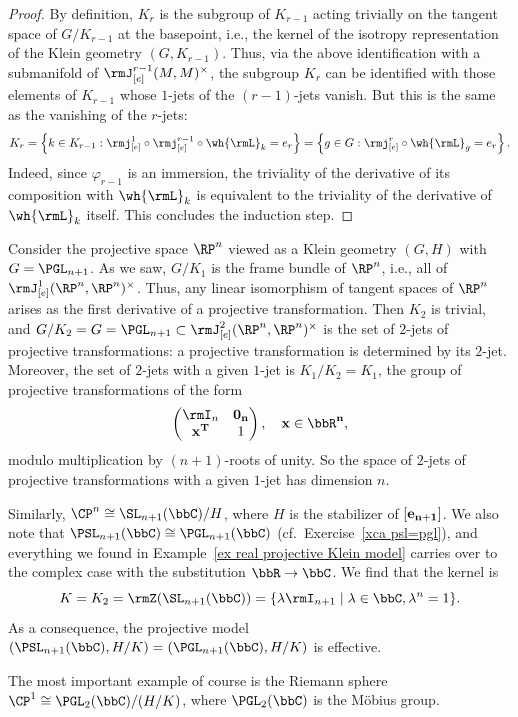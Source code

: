 \begin{proof}
    By definition, $K_r$ is the subgroup of $K_{r-1}$ acting trivially on the tangent space of $G\slash K_{r-1}$ at the basepoint, i.e., the kernel of the isotropy representation of the Klein geometry $(G,K_{r-1})$. Thus, via the above identification with a submanifold of $\rmJ^{r-1}_{[e]}(M,M)^\times$, the subgroup $K_r$ can be identified with those elements of $K_{r-1}$ whose $1$-jets of the $(r-1)$-jets vanish. But this is the same as the vanishing of the $r$-jets: 
    \[K_r=\left\{k\in K_{r-1}: \rmj^1_{[e]}\circ \rmj^{r-1}_{[e]}\circ\wh{\rmL}_k=e_r\right\}=\left\{g\in G: \rmj^r_{[e]}\circ \wh{\rmL}_g=e_r\right\}.\]
    Indeed, since $\varphi_{r-1}$ is an immersion, the triviality of the derivative of its composition with $\wh{\rmL}_k$ is equivalent to the triviality of the derivative of $\wh{\rmL}_k$ itself. This concludes the induction step.
\end{proof}



\begin{example}
    Consider the projective space $\RP^n$ viewed as a Klein geometry $(G,H)$ with $G=\PGL_{n+1}$. As we saw, $G\slash K_1$ is the frame bundle of $\RP^n$, i.e., all of $\rmJ^1_{[e]}(\RP^n,\RP^n)^\times$. Thus, any linear isomorphism of tangent spaces of $\RP^n$ arises as the first derivative of a projective transformation. Then $K_2$ is trivial, and $G\slash K_2=G=\PGL_{n+1}\subset \rmJ^2_{[e]}(\RP^n,\RP^n)^\times$ is the set of $2$-jets of projective transformations: a projective transformation is determined by its $2$-jet. Moreover, the set of $2$-jets with a given $1$-jet is $K_1\slash K_2=K_1$, the group of projective transformations of the form 
    \[\begin{pmatrix}
        \rmI_n & \bf{0}_n\\
        \bf{x}^T & 1
    \end{pmatrix},\quad \bf{x}\in\bbR^n,\]
    modulo multiplication by $(n+1)$-roots of unity.  So the space of $2$-jets of projective transformations with a given $1$-jet has dimension $n$.
\end{example}

\begin{example}
    Similarly, $\CP^n\cong \SL_{n+1}(\bbC)\slash H$, where $H$ is the stabilizer of $[\bf{e}_{n+1}]$. We also note that $\PSL_{n+1}(\bbC)\cong \PGL_{n+1}(\bbC)$ (cf.\ Exercise~\ref{xca psl=pgl}), and everything we found in Example~\ref{ex real projective Klein model} carries over to the complex case with the substitution $\bbR \to \bbC$. We find that the kernel is 
    \[K=K_2=\rmZ(\SL_{n+1}(\bbC))=\{\lambda \rmI_{n+1}\mid \lambda\in\bbC ,\lambda^n=1\}.\]
    As a consequence, the projective model $(\PSL_{n+1}(\bbC),H\slash K)=(\PGL_{n+1}(\bbC),H\slash K)$ is effective. 

    The most important example of course is the Riemann sphere $\CP^1\cong \PGL_2(\bbC)\slash (H\slash K)$, where $\PGL_2(\bbC)$ is the M\"obius group.
\end{example}







